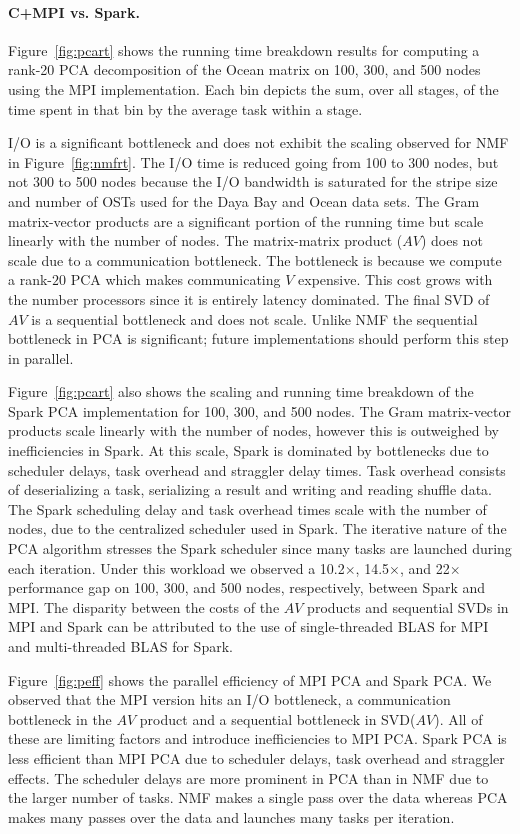 \paragraph{C+MPI vs. Spark.}
Figure~\ref{fig:pcart} shows the running time breakdown results for computing a rank-20 PCA decomposition of the Ocean matrix on 100, 300, and 500 nodes using the MPI implementation. Each bin depicts the sum, over all stages, of the time spent in that bin by the average task within a stage.

I/O is a significant bottleneck and does not exhibit the scaling observed for NMF in Figure~\ref{fig:nmfrt}. The I/O time is reduced going from 100 to 300 nodes, but not 300 to 500 nodes because the I/O bandwidth is saturated for the stripe size and number of OSTs used for the Daya Bay and Ocean data sets. The Gram matrix-vector products are a significant portion of the running time but scale linearly with the number of nodes. The matrix-matrix product ($AV$) does not scale due to a communication bottleneck. The bottleneck is because we compute a rank-$20$ PCA which makes communicating $V$ expensive. This cost grows with the number processors since it is entirely latency dominated. The final SVD of $AV$ is a sequential bottleneck and does not scale. Unlike NMF the sequential bottleneck in PCA is significant; future implementations should perform this step in parallel.

Figure~\ref{fig:pcart} also shows the scaling and running time breakdown of the Spark PCA implementation for 100, 300, and 500 nodes. The Gram matrix-vector products scale linearly with the number of nodes, however this is outweighed by inefficiencies in Spark. At this scale, Spark is dominated by bottlenecks due to scheduler delays, task overhead and straggler delay times. Task overhead consists of deserializing a task, serializing a result and writing and reading shuffle data. The Spark scheduling delay and task overhead times scale with the number of nodes, due to the centralized scheduler used in Spark. The iterative nature of the PCA algorithm stresses the Spark scheduler since many tasks are launched during each iteration. Under this workload we observed a 10.2$\times$, 14.5$\times$, and 22$\times$ performance gap on 100, 300, and 500 nodes, respectively, between Spark and MPI. The disparity between the costs of the $AV$ products and sequential SVDs in MPI and Spark can be attributed to the use of single-threaded BLAS for MPI and multi-threaded BLAS for Spark.

Figure~\ref{fig:peff} shows the parallel efficiency of MPI PCA and Spark PCA. We observed that the MPI version hits an I/O bottleneck, a communication bottleneck in the $AV$ product and a sequential bottleneck in SVD($AV$). All of these are limiting factors and introduce inefficiencies to MPI PCA. Spark PCA is less efficient than MPI PCA due to scheduler delays, task overhead and straggler effects. The scheduler delays are more prominent in PCA than in NMF due to the larger number of tasks. NMF makes a single pass over the data whereas PCA makes many passes over the data and launches many tasks per iteration.

